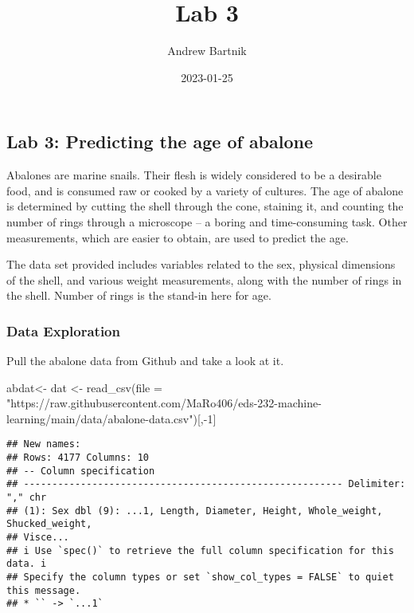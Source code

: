 \documentclass[
]{article}
\title{Lab 3}
\author{Andrew Bartnik}
\date{2023-01-25}
\newenvironment{Shaded}{\begin{snugshade}}{\end{snugshade}}
\newcommand{\AttributeTok}[1]{\textcolor[rgb]{0.77,0.63,0.00}{#1}}
\newcommand{\DecValTok}[1]{\textcolor[rgb]{0.00,0.00,0.81}{#1}}
\newcommand{\FunctionTok}[1]{\textcolor[rgb]{0.00,0.00,0.00}{#1}}
\newcommand{\NormalTok}[1]{#1}
\newcommand{\OtherTok}[1]{\textcolor[rgb]{0.56,0.35,0.01}{#1}}
\newcommand{\SpecialCharTok}[1]{\textcolor[rgb]{0.00,0.00,0.00}{#1}}
\newcommand{\StringTok}[1]{\textcolor[rgb]{0.31,0.60,0.02}{#1}}
\begin{document}
\maketitle

\hypertarget{lab-3-predicting-the-age-of-abalone}{%
\subsection{Lab 3: Predicting the age of
abalone}\label{lab-3-predicting-the-age-of-abalone}}

Abalones are marine snails. Their flesh is widely considered to be a
desirable food, and is consumed raw or cooked by a variety of cultures.
The age of abalone is determined by cutting the shell through the cone,
staining it, and counting the number of rings through a microscope -- a
boring and time-consuming task. Other measurements, which are easier to
obtain, are used to predict the age.

The data set provided includes variables related to the sex, physical
dimensions of the shell, and various weight measurements, along with the
number of rings in the shell. Number of rings is the stand-in here for
age.

\hypertarget{data-exploration}{%
\subsubsection{Data Exploration}\label{data-exploration}}

Pull the abalone data from Github and take a look at it.

\begin{Shaded}
\begin{Highlighting}[]
\NormalTok{abdat}\OtherTok{\textless{}{-}}\NormalTok{ dat }\OtherTok{\textless{}{-}} \FunctionTok{read\_csv}\NormalTok{(}\AttributeTok{file =} \StringTok{"https://raw.githubusercontent.com/MaRo406/eds{-}232{-}machine{-}learning/main/data/abalone{-}data.csv"}\NormalTok{)[,}\SpecialCharTok{{-}}\DecValTok{1}\NormalTok{]}
\end{Highlighting}
\end{Shaded}

\begin{verbatim}
## New names:
## Rows: 4177 Columns: 10
## -- Column specification
## -------------------------------------------------------- Delimiter: "," chr
## (1): Sex dbl (9): ...1, Length, Diameter, Height, Whole_weight, Shucked_weight,
## Visce...
## i Use `spec()` to retrieve the full column specification for this data. i
## Specify the column types or set `show_col_types = FALSE` to quiet this message.
## * `` -> `...1`
\end{verbatim}
\end{document}
